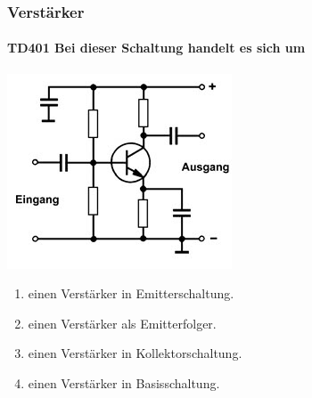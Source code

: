\documentclass[8pt]{article}
\begin{document}
\begin{enumerate}
\begin{enumerate}[nolistsep,label=\Alph*]
\pagebreak
\subsubsection{Verstärker}
\paragraph*{TD401 Bei dieser Schaltung handelt es sich um}
\begin{center}
	\begin{minipage}{\linewidth}
		\centering
		\includegraphics[scale=1.0]{pics/td401_a.jpg}
	\end{minipage}
\end{center}
\begin{enumerate}[nolistsep,label=\Alph*]
\item einen Verstärker in Emitterschaltung.
\item einen Verstärker als Emitterfolger.
\item einen Verstärker in Kollektorschaltung.
\item einen Verstärker in Basisschaltung.
\end{enumerate}


\end{enumerate}
\end{enumerate}
\end{document}
